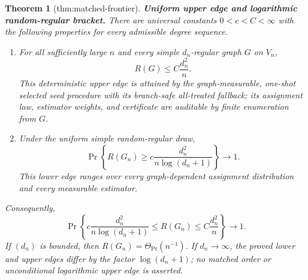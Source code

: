 \documentclass{article}
\newtheorem{theorem}{Theorem}
\begin{document}
\begin{theorem}[thm:matched-frontier]\label{thm:matched-frontier}
\textbf{Uniform upper edge and logarithmic random-regular bracket.}
There are universal constants \(0<c<C<\infty\) with the following properties for every admissible degree sequence.
\begin{enumerate}
\item For all sufficiently large \(n\) and every simple \(d_n\)-regular graph \(G\) on \(V_n\),
\[
R(G)\le C\frac{d_n^2}{n}.
\]
This deterministic upper edge is attained by the graph-measurable, one-shot selected seed procedure with its branch-safe all-treated fallback; its assignment law, estimator weights, and certificate are auditable by finite enumeration from \(G\).
\item Under the uniform simple random-regular draw,
\[
\Pr\!\left\{R(G_n)\ge c\frac{d_n^2}{n\log(d_n+1)}\right\}\longrightarrow1.
\]
This lower edge ranges over every graph-dependent assignment distribution and every measurable estimator.
\end{enumerate}
Consequently,
\[
\Pr\!\left\{
c\frac{d_n^2}{n\log(d_n+1)}
\le R(G_n)\le
C\frac{d_n^2}{n}
\right\}\longrightarrow1.
\]
If \((d_n)\) is bounded, then \(R(G_n)=\Theta_{\Pr}(n^{-1})\).  If \(d_n\to\infty\), the proved lower and upper edges differ by the factor \(\log(d_n+1)\); no matched order or unconditional logarithmic upper edge is asserted.
\end{theorem}
\end{document}
